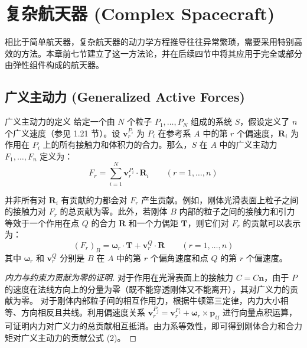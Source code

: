 \chapter{复杂航天器 (Complex Spacecraft)}

相比于简单航天器，复杂航天器的动力学方程推导往往异常繁琐，需要采用特别高效的方法。本章前七节建立了这一方法论，并在后续四节中将其应用于完全或部分由弹性组件构成的航天器。

\section{广义主动力 (Generalized Active Forces)}

\begin{mydefinition}{广义主动力的定义}
给定一个由 \(N\) 个粒子 \(P_1, \dots, P_N\) 组成的系统 \(S\)，假设定义了 \(n\) 个广义速度（参见 1.21 节）。设 \(\mathbf{v}_r^{P_i}\) 为 \(P_i\) 在参考系 \(A\) 中的第 \(r\) 个偏速度，\(\mathbf{R}_i\) 为作用在 \(P_i\) 上的所有接触力和体积力的合力。那么，\(S\) 在 \(A\) 中的广义主动力 \(F_1, \dots, F_n\) 定义为：
\begin{equation}
F_r = \sum_{i=1}^N \mathbf{v}_r^{P_i} \cdot \mathbf{R}_i \qquad (r=1,\dots,n) \tag{1}
\end{equation}
\end{mydefinition}

并非所有对 \(\mathbf{R}_i\) 有贡献的力都会对 \(F_r\) 产生贡献。例如，刚体光滑表面上粒子之间的接触力对 \(F_r\) 的总贡献为零。此外，若刚体 \(B\) 内部的粒子之间的接触力和引力等效于一个作用在点 \(Q\) 的合力 \(\mathbf{R}\) 和一个力偶矩 \(\mathbf{T}\)，则它们对 \(F_r\) 的贡献可以表示为：
\begin{equation}
(F_r)_B = \boldsymbol{\omega}_r \cdot \mathbf{T} + \mathbf{v}_r^Q \cdot \mathbf{R} \qquad (r=1,\dots,n) \tag{2}
\end{equation}
其中 \(\boldsymbol{\omega}_r\) 和 \(\mathbf{v}_r^Q\) 分别是 \(B\) 在 \(A\) 中的第 \(r\) 个偏角速度和点 \(Q\) 的第 \(r\) 个偏速度。

\begin{proof}[内力与约束力贡献为零的证明]
对于作用在光滑表面上的接触力 \(C = C\mathbf{n}\)，由于 \(P\) 的速度在法线方向上的分量为零（既不能穿透刚体又不能离开），其对广义力的贡献为零。
对于刚体内部粒子间的相互作用力，根据牛顿第三定律，内力大小相等、方向相反且共线。利用偏速度关系 \(\mathbf{v}_r^{P_j} = \mathbf{v}_r^{P_i} + \boldsymbol{\omega}_r \times \mathbf{p}_{ij}\) 进行向量点积运算，可证明内力对广义力的总贡献相互抵消。由力系等效性，即可得到刚体合力和合力矩对广义主动力的贡献公式 (2)。
\end{proof}


